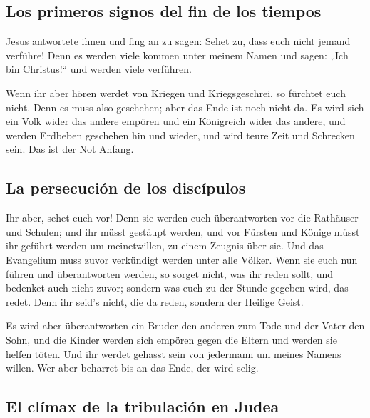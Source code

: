 \hypertarget{los-primeros-signos-del-fin-de-los-tiempos-1}{%
\subsection{Los primeros signos del fin de los
tiempos}\label{los-primeros-signos-del-fin-de-los-tiempos-1}}

 Jesus antwortete ihnen und fing an zu sagen: Sehet zu,
dass euch nicht jemand verführe!  Denn es werden viele
kommen unter meinem Namen und sagen: „Ich bin Christus!{}`` und werden
viele verführen.

 Wenn ihr aber hören werdet von Kriegen und
Kriegsgeschrei, so fürchtet euch nicht. Denn es muss also geschehen;
aber das Ende ist noch nicht da.  Es wird sich ein Volk
wider das andere empören und ein Königreich wider das andere, und werden
Erdbeben geschehen hin und wieder, und wird teure Zeit und Schrecken
sein. Das ist der Not Anfang.

\hypertarget{la-persecuciuxf3n-de-los-discuxedpulos}{%
\subsection{La persecución de los
discípulos}\label{la-persecuciuxf3n-de-los-discuxedpulos}}

 Ihr aber, sehet euch vor! Denn sie werden euch
überantworten vor die Rathäuser und Schulen; und ihr müsst gestäupt
werden, und vor Fürsten und Könige müsst ihr geführt werden um
meinetwillen, zu einem Zeugnis über sie.  Und das
Evangelium muss zuvor verkündigt werden unter alle Völker.
 Wenn sie euch nun führen und überantworten werden, so
sorget nicht, was ihr reden sollt, und bedenket auch nicht zuvor;
sondern was euch zu der Stunde gegeben wird, das redet. Denn ihr seid's
nicht, die da reden, sondern der Heilige Geist.

 Es wird aber überantworten ein Bruder den anderen zum
Tode und der Vater den Sohn, und die Kinder werden sich empören gegen
die Eltern und werden sie helfen töten.  Und ihr werdet
gehasst sein von jedermann um meines Namens willen. Wer aber beharret
bis an das Ende, der wird selig.

\hypertarget{el-cluxedmax-de-la-tribulaciuxf3n-en-judea}{%
\subsection{El clímax de la tribulación en
Judea}\label{el-cluxedmax-de-la-tribulaciuxf3n-en-judea}}

